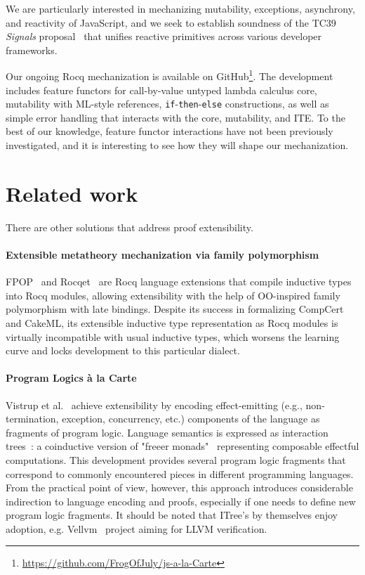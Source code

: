 \documentclass[sigplan,nonacm,review]{acmart}
\begin{document}
We are particularly interested in mechanizing
mutability, exceptions, asynchrony, and reactivity of JavaScript, and we seek to establish soundness of the TC39 \emph{Signals} proposal~\cite{signals-proposal-t39} that unifies reactive primitives across various developer frameworks. 



Our ongoing Rocq mechanization is available on
GitHub\footnote{\url{https://github.com/FrogOfJuly/js-a-la-Carte}}. 
The development includes feature functors for call-by-value untyped lambda calculus core, mutability with ML-style references, \texttt{if}-\texttt{then}-\texttt{else} constructions, as well as simple error handling that interacts with the core, mutability, and ITE. To the best of our knowledge, feature functor interactions have not been previously investigated, and it is interesting to see how they will shape our mechanization.

\section{Related work}

There are other solutions that address proof extensibility. 


\paragraph{Extensible metatheory mechanization via family polymorphism} FPOP~\cite{jin2023extensible} and Rocqet~\cite{ebresafe2025certified} are Rocq language extensions that compile inductive types into Rocq modules, allowing extensibility with the help of OO-inspired family polymorphism with late bindings. 
%
%
%
%
Despite its success in formalizing CompCert and CakeML, its extensible inductive type representation as Rocq modules is virtually incompatible with usual inductive types, which worsens the learning curve and locks development to this particular dialect. 

\paragraph{Program Logics à la Carte}
Vistrup et al.~\cite{vistrup2025program} achieve extensibility by encoding effect-emitting
(e.g., non-termination, exception, concurrency, etc.)
components of the language as fragments of program logic. 
Language semantics is expressed as interaction trees~\cite{xia2019interaction}: a coinductive version of "freeer monads"~\cite{kiselyov2015freer} representing composable effectful computations. 
This development provides several program logic fragments that correspond to commonly encountered pieces in different programming languages. 
%
%
%
%
From the practical point of view, however, this approach introduces considerable indirection to language encoding and proofs, especially if one needs to define new program logic fragments. It should be noted that ITree's by themselves enjoy adoption, e.g. Vellvm~\cite{zhao2012formalizing} project aiming for LLVM verification.
\end{document}
